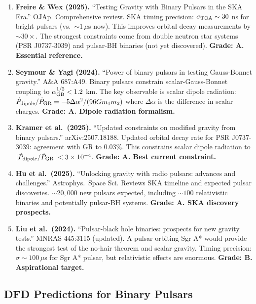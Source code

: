 \documentclass[11pt,a4paper]{article}
\begin{document}
\begin{enumerate}
\item \textbf{Freire \& Wex (2025).} ``Testing Gravity with Binary Pulsars in the SKA Era.'' OJAp. Comprehensive review. SKA timing precision: $\sigma_{\rm TOA} \sim 30$ ns for bright pulsars (vs.\ $\sim 1\,\mu$s now). This improves orbital decay measurements by $\sim 30\times$. The strongest constraints come from double neutron star systems (PSR J0737-3039) and pulsar-BH binaries (not yet discovered). \textbf{Grade: A. Essential reference.}

\item \textbf{Seymour \& Yagi (2024).} ``Power of binary pulsars in testing Gauss-Bonnet gravity.'' A\&A 687:A49. Binary pulsars constrain scalar-Gauss-Bonnet coupling to $\alpha_{\rm GB}^{1/2} < 1.2$ km. The key observable is scalar dipole radiation: $\dot{P}_{\rm dipole}/\dot{P}_{\rm GR} = -5\Delta\alpha^2/(96 G m_1 m_2)$ where $\Delta\alpha$ is the difference in scalar charges. \textbf{Grade: A. Dipole radiation formalism.}

\item \textbf{Kramer et al.\ (2025).} ``Updated constraints on modified gravity from binary pulsars.'' arXiv:2507.18188. Updated orbital decay rate for PSR J0737-3039: agreement with GR to $0.03\%$. This constrains scalar dipole radiation to $|\dot{P}_{\rm dipole}/\dot{P}_{\rm GR}| < 3 \times 10^{-4}$. \textbf{Grade: A. Best current constraint.}

\item \textbf{Hu et al.\ (2025).} ``Unlocking gravity with radio pulsars: advances and challenges.'' Astrophys.\ Space Sci. Reviews SKA timeline and expected pulsar discoveries. $\sim 20{,}000$ new pulsars expected, including $\sim 100$ relativistic binaries and potentially pulsar-BH systems. \textbf{Grade: A. SKA discovery prospects.}

\item \textbf{Liu et al.\ (2024).} ``Pulsar-black hole binaries: prospects for new gravity tests.'' MNRAS 445:3115 (updated). A pulsar orbiting Sgr A* would provide the strongest test of the no-hair theorem and scalar gravity. Timing precision: $\sigma \sim 100\,\mu$s for Sgr A* pulsar, but relativistic effects are enormous. \textbf{Grade: B. Aspirational target.}
\end{enumerate}

\subsection{DFD Predictions for Binary Pulsars}
\end{document}
